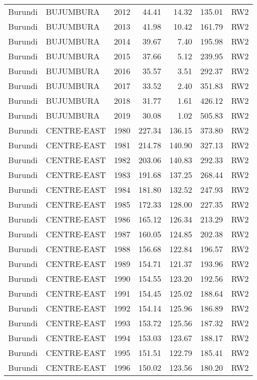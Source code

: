 \begin{longtable}{lllrrrl}
  Burundi & BUJUMBURA & 2012 & 44.41 & 14.32 & 135.01 & RW2 \\ 
  Burundi & BUJUMBURA & 2013 & 41.98 & 10.42 & 161.79 & RW2 \\ 
  Burundi & BUJUMBURA & 2014 & 39.67 & 7.40 & 195.98 & RW2 \\ 
  Burundi & BUJUMBURA & 2015 & 37.66 & 5.12 & 239.95 & RW2 \\ 
  Burundi & BUJUMBURA & 2016 & 35.57 & 3.51 & 292.37 & RW2 \\ 
  Burundi & BUJUMBURA & 2017 & 33.52 & 2.40 & 351.83 & RW2 \\ 
  Burundi & BUJUMBURA & 2018 & 31.77 & 1.61 & 426.12 & RW2 \\ 
  Burundi & BUJUMBURA & 2019 & 30.08 & 1.02 & 505.83 & RW2 \\ 
  Burundi & CENTRE-EAST & 1980 & 227.34 & 136.15 & 373.80 & RW2 \\ 
  Burundi & CENTRE-EAST & 1981 & 214.78 & 140.90 & 327.13 & RW2 \\ 
  Burundi & CENTRE-EAST & 1982 & 203.06 & 140.83 & 292.33 & RW2 \\ 
  Burundi & CENTRE-EAST & 1983 & 191.68 & 137.25 & 268.44 & RW2 \\ 
  Burundi & CENTRE-EAST & 1984 & 181.80 & 132.52 & 247.93 & RW2 \\ 
  Burundi & CENTRE-EAST & 1985 & 172.33 & 128.00 & 227.35 & RW2 \\ 
  Burundi & CENTRE-EAST & 1986 & 165.12 & 126.34 & 213.29 & RW2 \\ 
  Burundi & CENTRE-EAST & 1987 & 160.05 & 124.85 & 202.38 & RW2 \\ 
  Burundi & CENTRE-EAST & 1988 & 156.68 & 122.84 & 196.57 & RW2 \\ 
  Burundi & CENTRE-EAST & 1989 & 154.71 & 121.37 & 193.96 & RW2 \\ 
  Burundi & CENTRE-EAST & 1990 & 154.55 & 123.20 & 192.56 & RW2 \\ 
  Burundi & CENTRE-EAST & 1991 & 154.45 & 125.02 & 188.64 & RW2 \\ 
  Burundi & CENTRE-EAST & 1992 & 154.14 & 125.96 & 186.89 & RW2 \\ 
  Burundi & CENTRE-EAST & 1993 & 153.72 & 125.56 & 187.32 & RW2 \\ 
  Burundi & CENTRE-EAST & 1994 & 153.03 & 123.67 & 188.17 & RW2 \\ 
  Burundi & CENTRE-EAST & 1995 & 151.51 & 122.79 & 185.41 & RW2 \\ 
  Burundi & CENTRE-EAST & 1996 & 150.02 & 123.56 & 180.20 & RW2 \\ 

\end{longtable}
